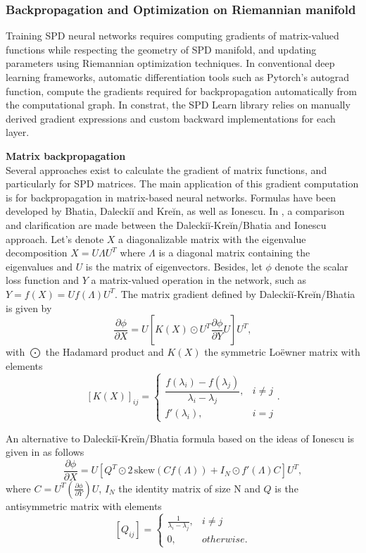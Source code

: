 \documentclass[11pt,a4paper]{article}
\begin{document}
\subsubsection{Backpropagation and Optimization on Riemannian manifold }
Training SPD neural networks requires computing gradients of matrix-valued functions while respecting the geometry of SPD manifold, and updating parameters using Riemannian optimization techniques. In conventional deep learning frameworks, automatic differentiation tools such as Pytorch's autograd function, compute the gradients required for backpropagation automatically from the computational graph. In constrat, the SPD Learn library relies on manually derived gradient expressions and custom backward implementations for each layer. 
\newline

\noindent \textbf{Matrix backpropagation} \\
Several approaches exist to calculate the gradient of matrix functions, and particularly for SPD matrices. The main application of this gradient computation is for backpropagation in matrix-based neural networks. Formulas have been developed by Bhatia, Daleckiĭ and Kreĭn, as well as Ionescu. In \cite{backprop}, a comparison and clarification are made between the Daleckiĭ-Kreĭn/Bhatia and Ionescu approach.  
Let's denote $X$ a diagonalizable matrix with the eigenvalue decomposition $X = U\Lambda U^T$ where $\Lambda$ is a diagonal matrix containing the eigenvalues and $U$ is the matrix of eigenvectors. Besides, let $\phi$ denote the scalar loss function and $Y$ a matrix-valued operation in the network, such as $ Y = f(X) = Uf(\Lambda)U^T$. 
The matrix gradient defined by Daleckiĭ-Kreĭn/Bhatia is given by  \[\frac{\partial \phi}{\partial X} = U \left[ K(X) \odot U^T \frac{\partial \phi}{\partial Y} U\right] U^T,\]
with $\bigodot$ the Hadamard product and $K(X)$ the symmetric Loëwner matrix with elements \[ [K(X)]_{ij} = \begin{cases}
\dfrac{f(\lambda_i) - f(\lambda_j)}{\lambda_i - \lambda_j}, & i \neq j \\
f'(\lambda_i), & i = j
\end{cases} .\]

\noindent An alternative to Daleckiĭ-Kreĭn/Bhatia formula based on the ideas of Ionescu is given in \cite{backprop} as follows  
\[ \frac{\partial \phi}{\partial X} = U [Q^T \odot 2\,\mathrm{skew}(C f(\Lambda)) + I_N \odot f'(\Lambda)C]U^T,\] where $C = U^T(\frac{\partial \phi}{\partial Y})U$, $I_N$ the identity matrix of size N and  $Q$ is the antisymmetric matrix with elements \[ [Q_{ij}] = \begin{cases}
    \frac{1}{\lambda_i - \lambda_j}, & i\neq j\\
    0, & otherwise.
\end{cases}\]
\end{document}
